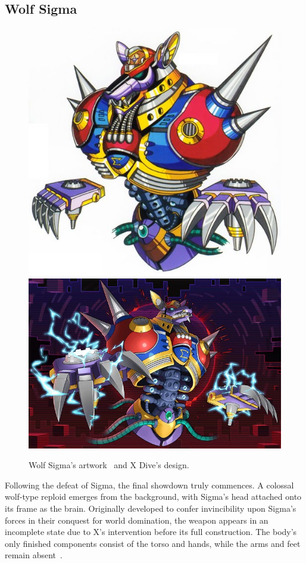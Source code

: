 \subsection{Wolf Sigma}\label{boss:wolf_sigma}
\begin{figure}[htp]
	\centering
	\includegraphics[height=\portraitsize]{figures/X1/Sigma_stages/WolfSigma.jpg}
	\includegraphics[height=\portraitsize]{figures/X1/Sigma_stages/Wolf_Sigma.png}
	\caption{Wolf Sigma's artwork~\cite{book:MMX_Complete_art} and X Dive's design.}
\end{figure}
Following the defeat of Sigma, the final showdown truly commences. A colossal wolf-type reploid emerges from the background, with Sigma's head attached onto its frame as the brain. Originally developed to confer invincibility upon Sigma's forces in their conquest for world domination, the weapon appears in an incomplete state due to X's intervention before its full construction. The body's only finished components consist of the torso and hands, while the arms and feet remain absent~\cite{wayback:X_resources}.

